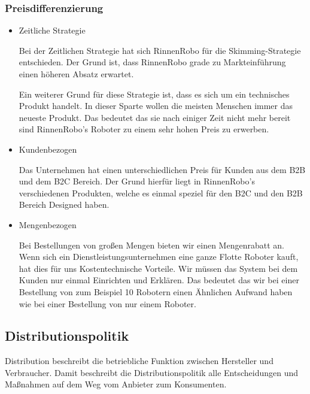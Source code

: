 \subsubsection{Preisdifferenzierung} \label{Preisdiff}
    \begin{itemize}
        \item Zeitliche Strategie
            
            Bei der Zeitlichen Strategie hat sich RinnenRobo für die Skimming-Strategie entschieden. Der Grund ist, dass 
            RinnenRobo grade zu Markteinführung einen höheren Absatz erwartet.

            Ein weiterer Grund für diese Strategie ist, dass es sich um ein technisches Produkt handelt. In dieser
            Sparte wollen die meisten Menschen immer das neueste Produkt. Das bedeutet das sie nach einiger Zeit 
            nicht mehr bereit sind RinnenRobo's Roboter zu einem sehr hohen Preis zu erwerben.

        \item Kundenbezogen

            Das Unternehmen hat einen unterschiedlichen Preis für Kunden aus dem B2B und dem B2C Bereich. Der Grund 
            hierfür liegt in RinnenRobo's verschiedenen Produkten, welche es einmal speziel für den B2C und den B2B
            Bereich Designed haben.

        \item Mengenbezogen
        
            Bei Bestellungen von großen Mengen bieten wir einen Mengenrabatt an. Wenn sich ein 
            Dienstleistungsunternehmen eine ganze Flotte Roboter kauft, hat dies für uns Kostentechnische Vorteile.
            Wir müssen das System bei dem Kunden nur einmal Einrichten und Erklären. Das bedeutet das wir bei einer 
            Bestellung von zum Beispiel 10 Robotern einen Ähnlichen Aufwand haben wie bei einer Bestellung von nur einem 
            Roboter.
        \end{itemize}

        \subsection{Distributionspolitik} \label{distro}
        Distribution beschreibt die betriebliche Funktion zwischen Hersteller und Verbraucher. Damit beschreibt die
        Distributionspolitik alle Entscheidungen und Maßnahmen auf dem Weg vom Anbieter zum Konsumenten.
    
